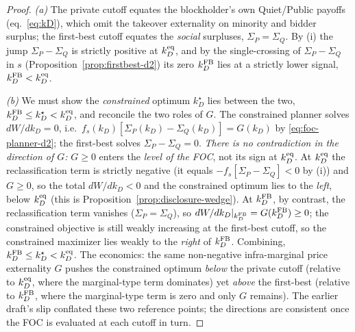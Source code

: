 \begin{proof}
\emph{(a)} The private cutoff equates the blockholder's own Quiet/Public payoffs
(eq.~\eqref{eq:kD}), which omit the takeover externality on minority and bidder
surplus; the first-best cutoff equates the \emph{social} surpluses,
$\Sigma_P=\Sigma_Q$. By (i) the jump $\Sigma_P-\Sigma_Q$ is strictly positive at
$k_D^{\textup{eq}}$, and by the single-crossing of $\Sigma_P-\Sigma_Q$ in $s$
(Proposition~\ref{prop:firstbest-d2}) its zero $k_D^{\textup{FB}}$ lies at a
strictly lower signal, $k_D^{\textup{FB}}<k_D^{\textup{eq}}$.

\emph{(b)} We must show the \emph{constrained} optimum $k_D^{\star}$ lies between
the two, $k_D^{\textup{FB}}\le k_D^{\star}<k_D^{\textup{eq}}$, and reconcile the
two roles of $G$. The constrained planner solves $dW/dk_D=0$, i.e.\
$f_s(k_D)[\Sigma_P(k_D)-\Sigma_Q(k_D)]=G(k_D)$ by \eqref{eq:foc-planner-d2}; the
first-best solves $\Sigma_P-\Sigma_Q=0$. \emph{There is no contradiction in the
direction of $G$:} $G\ge0$ enters the \emph{level of the FOC}, not its sign at
$k_D^{\textup{eq}}$. At $k_D^{\textup{eq}}$ the reclassification term is strictly
negative (it equals $-f_s[\Sigma_P-\Sigma_Q]<0$ by (i)) and $G\ge0$, so the total
$dW/dk_D<0$ and the constrained optimum lies to the \emph{left}, below
$k_D^{\textup{eq}}$ (this is Proposition~\ref{prop:disclosure-wedge}). At
$k_D^{\textup{FB}}$, by contrast, the reclassification term vanishes
($\Sigma_P=\Sigma_Q$), so $dW/dk_D|_{k_D^{\textup{FB}}}=G(k_D^{\textup{FB}})\ge0$;
the constrained objective is still weakly increasing at the first-best cutoff, so
the constrained maximizer lies weakly to the \emph{right} of $k_D^{\textup{FB}}$.
Combining, $k_D^{\textup{FB}}\le k_D^{\star}<k_D^{\textup{eq}}$. The economics:
the same non-negative infra-marginal price externality $G$ pushes the constrained
optimum \emph{below} the private cutoff (relative to $k_D^{\textup{eq}}$, where the
marginal-type term dominates) yet \emph{above} the first-best (relative to
$k_D^{\textup{FB}}$, where the marginal-type term is zero and only $G$ remains).
The earlier draft's slip conflated these two reference points; the directions are
consistent once the FOC is evaluated at each cutoff in turn.
\end{proof}

